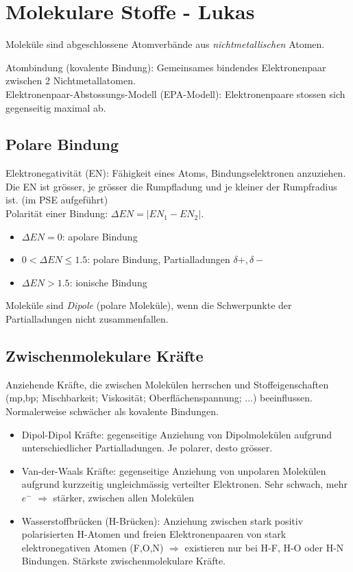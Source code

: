 \section{Molekulare Stoffe - Lukas}
Moleküle sind abgeschlossene Atomverbände aus \emph{nichtmetallischen} Atomen. 

Atombindung (kovalente Bindung): Gemeinsames bindendes Elektronenpaar zwischen 2 Nichtmetallatomen. \\

Elektronenpaar-Abstossungs-Modell (EPA-Modell): Elektronenpaare stossen sich gegenseitig maximal ab. \\

\subsection{Polare Bindung}
Elektronegativität (EN): Fähigkeit eines Atoms, Bindungselektronen anzuziehen. Die EN ist grösser, je grösser die Rumpfladung und je kleiner der Rumpfradius ist. (im PSE aufgeführt) \\

Polarität einer Bindung: $\Delta EN = | EN_{1} - EN_{2} |$. 
\begin{itemize}
	\item $\Delta EN = 0$: apolare Bindung
	\item $0 < \Delta EN  \leq 1.5$: polare Bindung, Partialladungen $\delta+, \delta-$
	\item $\Delta EN > 1.5$: ionische Bindung
\end{itemize}

Moleküle sind \emph{Dipole} (polare Moleküle), wenn die Schwerpunkte der Partialladungen nicht zusammenfallen. 

\subsection{Zwischenmolekulare Kräfte}
Anziehende Kräfte, die zwischen Molekülen herrschen und Stoffeigenschaften (mp,bp; Mischbarkeit; Viskosität; Oberflächenspannung; ...) beeinflussen. Normalerweise schwächer als kovalente Bindungen.

\begin{itemize}
	\item Dipol-Dipol Kräfte: gegenseitige Anziehung von Dipolmolekülen aufgrund unterschiedlicher Partialladungen. Je polarer, desto grösser.
	\item Van-der-Waals Kräfte: gegenseitige Anziehung von unpolaren Molekülen aufgrund kurzzeitig ungleichmässig verteilter Elektronen. Sehr schwach, mehr $e^-$ $\Rightarrow$ stärker, zwischen allen Molekülen
	\item Wasserstoffbrücken (H-Brücken): Anziehung zwischen stark positiv polarisierten H-Atomen und freien Elektronenpaaren von stark elektronegativen Atomen (F,O,N) $\Rightarrow$ existieren nur bei H-F, H-O oder H-N Bindungen. Stärkste zwischenmolekulare Kräfte.
\end{itemize}

